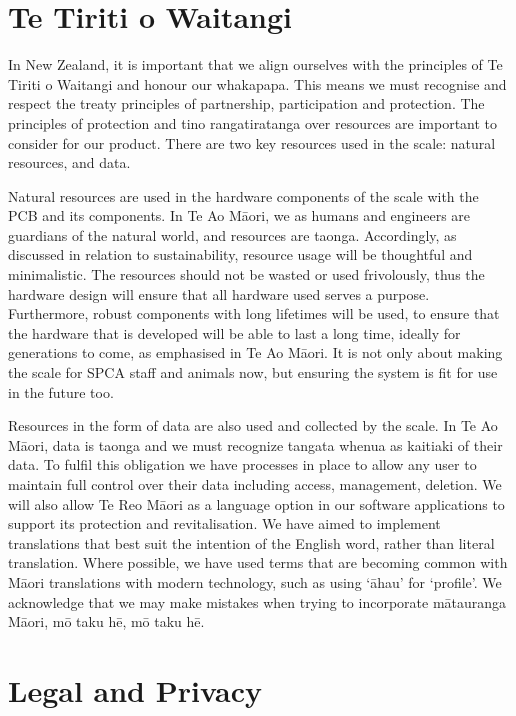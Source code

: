 \section{Te Tiriti o Waitangi}

In New Zealand, it is important that we align ourselves with the principles of Te Tiriti o Waitangi and honour our whakapapa. This means we must recognise and respect the treaty principles of partnership, participation and protection. The principles of protection and tino rangatiratanga over resources are important to consider for our product. There are two key resources used in the scale: natural resources, and data. 

Natural resources are used in the hardware components of the scale with the PCB and its components. In Te Ao Māori, we as humans and engineers are guardians of the natural world, and resources are taonga. Accordingly, as discussed in relation to sustainability, resource usage will be thoughtful and minimalistic. The resources should not be wasted or used frivolously, thus the hardware design will ensure that all hardware used serves a purpose. Furthermore, robust components with long lifetimes will be used, to ensure that the hardware that is developed will be able to last a long time, ideally for generations to come, as emphasised in Te Ao Māori. It is not only about making the scale for SPCA staff and animals now, but ensuring the system is fit for use in the future too.

Resources in the form of data are also used and collected by the scale. In Te Ao Māori, data is taonga and we must recognize tangata whenua as kaitiaki of their data. To fulfil this obligation we have processes in place to allow any user to maintain full control over their data including access, management, deletion. We will also allow Te Reo Māori as a language option in our software applications to support its protection and revitalisation. We have aimed to implement translations that best suit the intention of the English word, rather than literal translation. Where possible, we have used terms that are becoming common with Māori translations with modern technology, such as using ‘āhau’ for ‘profile’. We acknowledge that we may make mistakes when trying to incorporate mātauranga Māori, mō taku hē, mō taku hē.

\section{Legal and Privacy}

